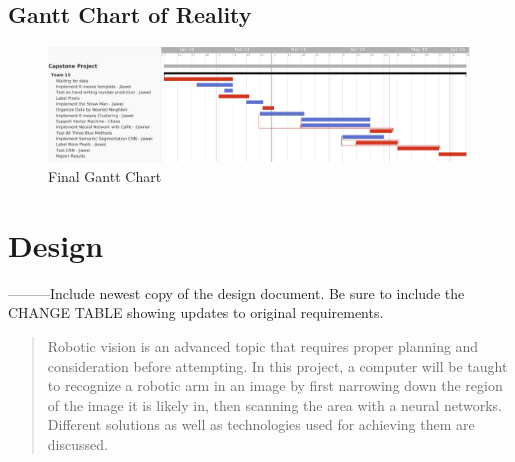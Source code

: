 \documentclass[10pt,journal,compsoc, draftclsnofoot,onecolumn]{IEEEtran}
\begin{document}
\subsection{Gantt Chart of Reality}
\begin{figure}[H]
  \begin{center}
    \includegraphics[width=1.\textwidth]{update_chart.JPG}
  \end{center}
  \caption{Final Gantt Chart}
\end{figure}


\newpage
\section{Design}
---------Include newest copy of the design document. Be sure to include the CHANGE TABLE showing updates to original requirements.

\begin{abstract}
Robotic vision is an advanced topic that requires proper planning and consideration before attempting. In this project, a computer will be taught to recognize a robotic arm in an image by first narrowing down the region of the image it is likely in, then scanning the area with a neural networks. Different solutions as well as technologies used for achieving them are discussed.
\end{abstract}
\end{document}
